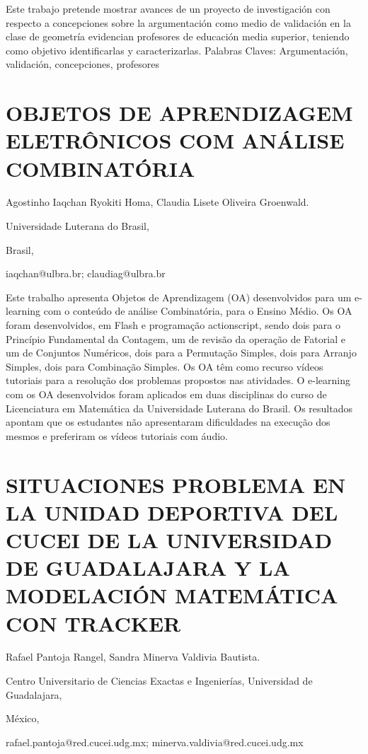 Este trabajo pretende mostrar avances de un proyecto de investigación
con respecto a concepciones sobre la argumentación como medio de validación
en la clase de geometría evidencian profesores de educación media
superior, teniendo como objetivo identificarlas y caracterizarlas.
Palabras Claves: Argumentación, validación, concepciones, profesores


\section{OBJETOS DE APRENDIZAGEM ELETRÔNICOS COM ANÁLISE COMBINATÓRIA}

\begin{datos}

Agostinho Iaqchan Ryokiti Homa, Claudia Lisete Oliveira Groenwald.

Universidade Luterana do Brasil, 

Brasil,

iaqchan@ulbra.br; claudiag@ulbra.br 

\end{datos}

Este trabalho apresenta Objetos de Aprendizagem (OA) desenvolvidos
para um e-learning com o conteúdo de análise Combinatória, para o
Ensino Médio. Os OA foram desenvolvidos, em Flash e programação actionscript,
sendo dois para o Princípio Fundamental da Contagem, um de revisão
da operação de Fatorial e um de Conjuntos Numéricos, dois para a Permutação
Simples, dois para Arranjo Simples, dois para Combinação Simples.
Os OA têm como recurso vídeos tutoriais para a resolução dos problemas
propostos nas atividades. O e-learning com os OA desenvolvidos foram
aplicados em duas disciplinas do curso de Licenciatura em Matemática
da Universidade Luterana do Brasil. Os resultados apontam que os estudantes
não apresentaram dificuldades na execução dos mesmos e preferiram
os vídeos tutoriais com áudio.


\section{SITUACIONES PROBLEMA EN LA UNIDAD DEPORTIVA DEL CUCEI DE LA UNIVERSIDAD
DE GUADALAJARA Y LA MODELACIÓN MATEMÁTICA CON TRACKER }

\begin{datos}

Rafael Pantoja Rangel, Sandra Minerva Valdivia Bautista. 

Centro Universitario de Ciencias Exactas e Ingenierías, Universidad
de Guadalajara,

México,

rafael.pantoja@red.cucei.udg.mx; minerva.valdivia@red.cucei.udg.mx

\end{datos}

